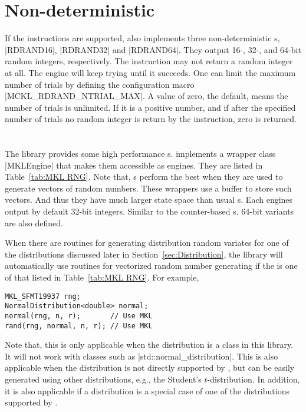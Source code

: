 \section{Non-deterministic \texorpdfstring{\protect\rng}{RNG}}
\label{sec:Non-deterministic RNG}

If the \rdrand instructions are supported, \mckl also implements three
non-deterministic \rng{}s, |RDRAND16|, |RDRAND32| and |RDRAND64|. They output
16-, 32-, and 64-bit random integers, respectively. The \rdrand instruction may
not return a random integer at all. The \rng engine will keep trying until it
succeeds. One can limit the maximum number of trials by defining the
configuration macro |MCKL_RDRAND_NTRIAL_MAX|. A value of zero, the default,
means the number of trials is unlimited. If it is a positive number, and if
after the specified number of trials no random integer is return by the \rdrand
instruction, zero is returned.

\section{\texorpdfstring{\protect\rng{} \protect\rng}{MKL RNG}}
\label{sec:MKL RNG}

The \mkl library provides some high performance \rng{}s. \mckl implements a
wrapper class |MKLEngine| that makes them accessible as \cpp engines. They are
listed in Table~\ref{tab:MKL RNG}. Note that, \mkl{} \rng{}s perform the best
when they are used to generate vectors of random numbers. These wrappers use a
buffer to store such vectors. And thus they have much larger state space than
usual \rng{}s. Each \rng engines output by default 32-bit integers. Similar to
the counter-based \rng{}s, 64-bit variants are also defined.

When there are \mkl routines for generating distribution random variates for
one of the distributions discussed later in Section~\ref{sec:Distribution}, the
library will automatically use \mkl routines for vectorized random number
generating if the \rng{} is one of that listed in Table~\ref{tab:MKL RNG}. For
example,
\begin{Verbatim}
MKL_SFMT19937 rng;
NormalDistribution<double> normal;
normal(rng, n, r);       // Use MKL
rand(rng, normal, n, r); // Use MKL
\end{Verbatim}
Note that, this is only applicable when the distribution is a class in this
library. It will not work with classes such as |std::normal_distribution|. This
is also applicable when the distribution is not directly supported by \mkl, but
can be easily generated using other distributions, e.g., the Student's
$t$-distribution. In addition, it is also applicable if a distribution is a
special case of one of the distributions supported by \mkl.

